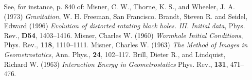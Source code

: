 \documentclass{article}
\begin{document}
\begin{thebibliography}{9}
    See, for instance, p. 840 of:
    Misner, C. W., Thorne, K. S., and Wheeler, J. A. (1973)
    \emph{Gravitation}, W. H. Freeman, San Francisco.
    Brandt, Steven R. and Seidel, Edward (1996)
    \emph{Evolution of distorted rotating black holes. III. Initial
    data},
    Phys. Rev., \textbf{D54}, 1403--1416.
    Misner, Charles W. (1960)
    \emph{Wormhole Initial Conditions},
    Phys. Rev., \textbf{118}, 1110--1111.
    Misner, Charles W. (1963)
    \emph{The Method of Images in Geometrostatics},
    Ann. Phys., \textbf{24}, 102--117.
    Brill, Dieter R., and Lindquist, Richard W. (1963)
    \emph{Interaction Energy in Geometrostatics}
    Phys. Rev., \textbf{131}, 471--476.
\end{thebibliography}

\end{document}
